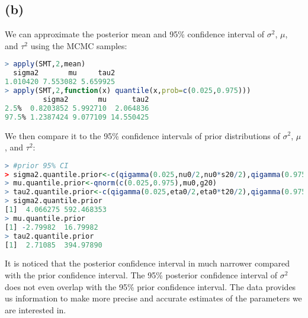 \documentclass[10pt]{article}
\begin{document}
\subsection*{(b)}
We can approximate the posterior mean and 95\% confidence interval of $\sigma^2$, $\mu$, and $\tau^2$ using the MCMC samples:
\begin{lstlisting}[language=R,frame=single]
> apply(SMT,2,mean)
  sigma2       mu     tau2 
1.010420 7.553082 5.659925 
> apply(SMT,2,function(x) quantile(x,prob=c(0.025,0.975)))
         sigma2       mu      tau2
2.5%  0.8203852 5.992710  2.064836
97.5% 1.2387424 9.077109 14.550425
\end{lstlisting}
\par
We then compare it to the 95\% confidence intervals of prior distributions of $\sigma^2$, $\mu$, and $\tau^2$:
\begin{lstlisting}[language=R,breaklines,frame=single,keepspaces=true]
> #prior 95% CI
> sigma2.quantile.prior<-c(qigamma(0.025,nu0/2,nu0*s20/2),qigamma(0.975,nu0/2,nu0*s20/2))
> mu.quantile.prior<-qnorm(c(0.025,0.975),mu0,g20)
> tau2.quantile.prior<-c(qigamma(0.025,eta0/2,eta0*t20/2),qigamma(0.975,eta0/2,eta0*t20/2))
> sigma2.quantile.prior
[1]  4.066275 592.468353
> mu.quantile.prior
[1] -2.79982  16.79982
> tau2.quantile.prior
[1]  2.71085  394.97890
\end{lstlisting}
\par
It is noticed that the posterior confidence interval in much narrower compared with the prior confidence interval. The 95\% posterior confidence interval of $\sigma^2$ does not even overlap with the 95\% prior confidence interval. The data provides us information to make more precise and accurate estimates of the parameters we are interested in.
\end{document}
